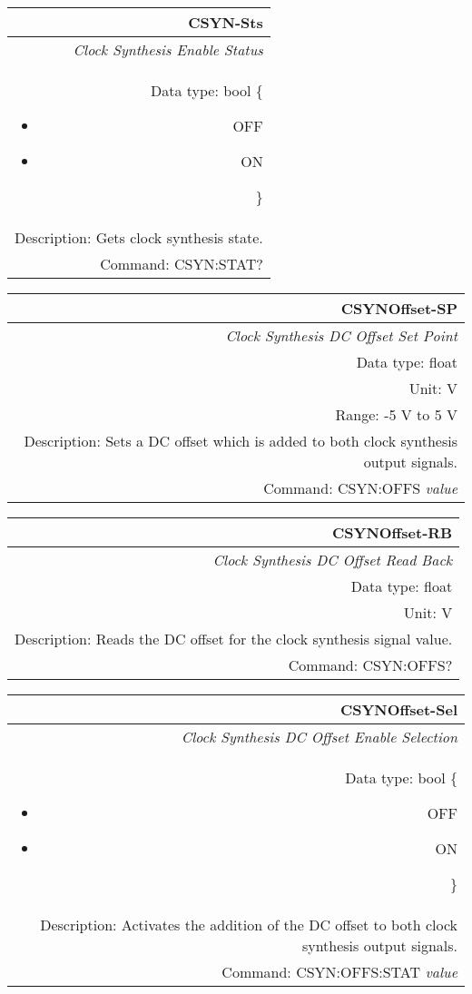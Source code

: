 \documentclass[openany]{article}
\begin{document}
		\begin{tabular}{N}
			\hline
			\bfseries CSYN-Sts \\ \hline
			\emph{Clock Synthesis Enable Status} \\
			Data type: bool \{\begin{itemize}[noitemsep]
				\small
				\item[] OFF
				\item[] ON
			\end{itemize}\} \\
			Description: Gets clock synthesis state. \\
			Command: CSYN:STAT? \\
			
		\end{tabular}
%
		\begin{tabular}{N}
			\hline
			\bfseries CSYNOffset-SP \\ \hline
			\emph{Clock Synthesis DC Offset Set Point} \\
			Data type: float \\
			Unit: V \\
			Range: -5 V to 5 V \\
			Description: Sets a DC offset which is added to both clock synthesis output signals. \\
			Command: CSYN:OFFS \emph{value} \\

		\end{tabular}


		\begin{tabular}{N}
			\hline
			\bfseries CSYNOffset-RB \\ \hline
			\emph{Clock Synthesis DC Offset Read Back} \\
			Data type: float \\
			Unit: V \\
			Description: Reads the DC offset for the clock synthesis signal value. \\
			Command: CSYN:OFFS? \\

		\end{tabular}
%
		\begin{tabular}{N}
			\hline
			\bfseries CSYNOffset-Sel \\ \hline
			\emph{Clock Synthesis DC Offset Enable Selection} \\
			Data type: bool \{\begin{itemize}[noitemsep]
				\small
				\item[] OFF
				\item[] ON
			\end{itemize}\} \\
			Description: Activates the addition of the DC offset to both clock synthesis output signals. \\
			Command: CSYN:OFFS:STAT \emph{value} \\

		\end{tabular}
\end{document}
